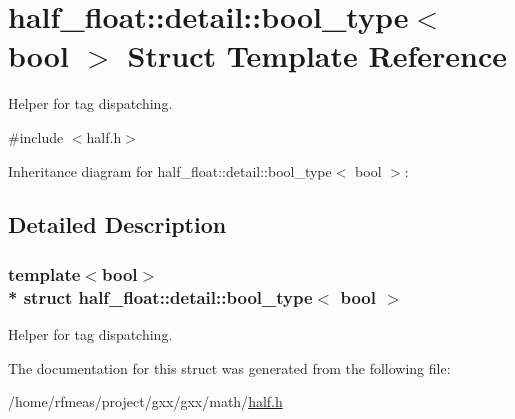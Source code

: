 \hypertarget{structhalf__float_1_1detail_1_1bool__type}{}\section{half\+\_\+float\+:\+:detail\+:\+:bool\+\_\+type$<$ bool $>$ Struct Template Reference}
\label{structhalf__float_1_1detail_1_1bool__type}


Helper for tag dispatching.  




{\ttfamily \#include $<$half.\+h$>$}



Inheritance diagram for half\+\_\+float\+:\+:detail\+:\+:bool\+\_\+type$<$ bool $>$\+:


\subsection{Detailed Description}
\subsubsection*{template$<$bool$>$\\*
struct half\+\_\+float\+::detail\+::bool\+\_\+type$<$ bool $>$}

Helper for tag dispatching. 

The documentation for this struct was generated from the following file\+:\begin{DoxyCompactItemize}
\item 
/home/rfmeas/project/gxx/gxx/math/\hyperlink{half_8h}{half.\+h}\end{DoxyCompactItemize}
